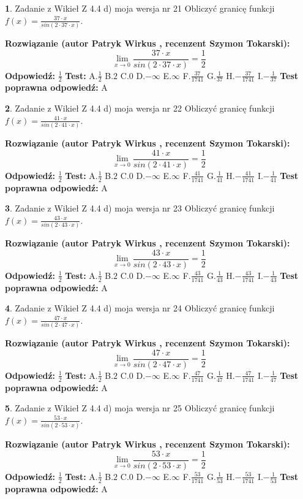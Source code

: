\documentclass[12pt, a4paper]{article}
\theoremstyle{definition} %
\newtheorem{zad}{}
\newcommand{\zadStart}[1]{\begin{zad}#1\newline}
\newcommand{\zadStop}{\end{zad}}
\newcommand{\rozwStart}[2]{\noindent \textbf{Rozwiązanie (autor #1 , recenzent #2): }\newline}
\newcommand{\rozwStop}{\newline}
\newcommand{\odpStart}{\noindent \textbf{Odpowiedź:}\newline}
\newcommand{\odpStop}{\newline}
\newcommand{\testStart}{\noindent \textbf{Test:}\newline}
\newcommand{\testStop}{\newline}
\newcommand{\kluczStart}{\noindent \textbf{Test poprawna odpowiedź:}\newline}
\newcommand{\kluczStop}{\newline}
\begin{document}
\zadStart{Zadanie z Wikieł Z 4.4 d) moja wersja nr 21}
Obliczyć granicę funkcji $f(x)=\frac{37\cdot x}{sin(2 \cdot37\cdot x)}$.
\zadStop
\rozwStart{Patryk Wirkus}{Szymon Tokarski}
$$\lim\limits_{x\to 0}\frac{37\cdot x}{sin(2 \cdot37\cdot x)}=\frac{1}{2}$$
\rozwStop
\odpStart
$\frac{1}{2}$
\odpStop
\testStart
A.$\frac{1}{2}$
B.$2$
C.$0$
D.$-\infty$
E.$\infty$
F.$\frac{37}{1741}$
G.$\frac{1}{37}$
H.$-\frac{37}{1741}$
I.$-\frac{1}{37}$
\testStop
\kluczStart
A
\kluczStop



\zadStart{Zadanie z Wikieł Z 4.4 d) moja wersja nr 22}
Obliczyć granicę funkcji $f(x)=\frac{41\cdot x}{sin(2 \cdot41\cdot x)}$.
\zadStop
\rozwStart{Patryk Wirkus}{Szymon Tokarski}
$$\lim\limits_{x\to 0}\frac{41\cdot x}{sin(2 \cdot41\cdot x)}=\frac{1}{2}$$
\rozwStop
\odpStart
$\frac{1}{2}$
\odpStop
\testStart
A.$\frac{1}{2}$
B.$2$
C.$0$
D.$-\infty$
E.$\infty$
F.$\frac{41}{1741}$
G.$\frac{1}{41}$
H.$-\frac{41}{1741}$
I.$-\frac{1}{41}$
\testStop
\kluczStart
A
\kluczStop



\zadStart{Zadanie z Wikieł Z 4.4 d) moja wersja nr 23}
Obliczyć granicę funkcji $f(x)=\frac{43\cdot x}{sin(2 \cdot43\cdot x)}$.
\zadStop
\rozwStart{Patryk Wirkus}{Szymon Tokarski}
$$\lim\limits_{x\to 0}\frac{43\cdot x}{sin(2 \cdot43\cdot x)}=\frac{1}{2}$$
\rozwStop
\odpStart
$\frac{1}{2}$
\odpStop
\testStart
A.$\frac{1}{2}$
B.$2$
C.$0$
D.$-\infty$
E.$\infty$
F.$\frac{43}{1741}$
G.$\frac{1}{43}$
H.$-\frac{43}{1741}$
I.$-\frac{1}{43}$
\testStop
\kluczStart
A
\kluczStop



\zadStart{Zadanie z Wikieł Z 4.4 d) moja wersja nr 24}
Obliczyć granicę funkcji $f(x)=\frac{47\cdot x}{sin(2 \cdot47\cdot x)}$.
\zadStop
\rozwStart{Patryk Wirkus}{Szymon Tokarski}
$$\lim\limits_{x\to 0}\frac{47\cdot x}{sin(2 \cdot47\cdot x)}=\frac{1}{2}$$
\rozwStop
\odpStart
$\frac{1}{2}$
\odpStop
\testStart
A.$\frac{1}{2}$
B.$2$
C.$0$
D.$-\infty$
E.$\infty$
F.$\frac{47}{1741}$
G.$\frac{1}{47}$
H.$-\frac{47}{1741}$
I.$-\frac{1}{47}$
\testStop
\kluczStart
A
\kluczStop



\zadStart{Zadanie z Wikieł Z 4.4 d) moja wersja nr 25}
Obliczyć granicę funkcji $f(x)=\frac{53\cdot x}{sin(2 \cdot53\cdot x)}$.
\zadStop
\rozwStart{Patryk Wirkus}{Szymon Tokarski}
$$\lim\limits_{x\to 0}\frac{53\cdot x}{sin(2 \cdot53\cdot x)}=\frac{1}{2}$$
\rozwStop
\odpStart
$\frac{1}{2}$
\odpStop
\testStart
A.$\frac{1}{2}$
B.$2$
C.$0$
D.$-\infty$
E.$\infty$
F.$\frac{53}{1741}$
G.$\frac{1}{53}$
H.$-\frac{53}{1741}$
I.$-\frac{1}{53}$
\testStop
\kluczStart
A
\kluczStop
\end{document}
